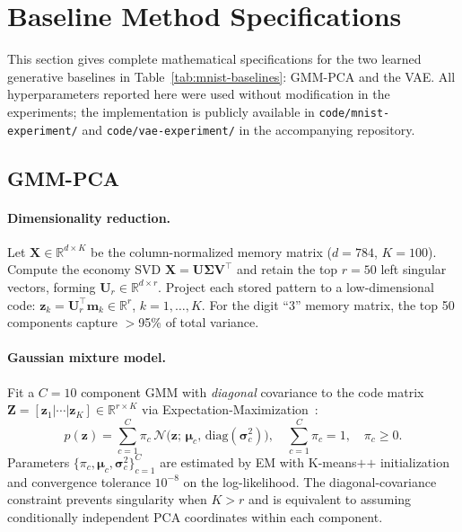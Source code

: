 \section{Baseline Method Specifications}\label{app:baseline-methods}

This section gives complete mathematical specifications for the two learned generative
baselines in Table~\ref{tab:mnist-baselines}: GMM-PCA and the VAE.
All hyperparameters reported here were used without modification in the experiments;
the implementation is publicly available in \texttt{code/mnist-experiment/} and
\texttt{code/vae-experiment/} in the accompanying repository.

\subsection{GMM-PCA}\label{app:gmm-pca}

\paragraph{Dimensionality reduction.}
Let $\mathbf{X}\in\mathbb{R}^{d\times K}$ be the column-normalized memory matrix
($d{=}784$, $K{=}100$). Compute the economy SVD
$\mathbf{X}=\mathbf{U}\boldsymbol{\Sigma}\mathbf{V}^{\!\top}$ and retain the top
$r{=}50$ left singular vectors, forming $\mathbf{U}_{r}\in\mathbb{R}^{d\times r}$.
Project each stored pattern to a low-dimensional code:
$\mathbf{z}_{k}=\mathbf{U}_{r}^{\!\top}\mathbf{m}_{k}\in\mathbb{R}^{r}$, $k=1,\dots,K$.
For the digit ``3'' memory matrix, the top 50 components capture $>$95\% of total variance.

\paragraph{Gaussian mixture model.}
Fit a $C{=}10$ component GMM with \emph{diagonal} covariance to the code matrix
$\mathbf{Z}{=}[\mathbf{z}_1|\cdots|\mathbf{z}_K]\in\mathbb{R}^{r\times K}$ via
Expectation-Maximization~\cite{dempsterMaximumLikelihoodIncomplete1977}:
\begin{equation}
  p(\mathbf{z}) = \sum_{c=1}^{C}\pi_c\,
  \mathcal{N}\!\bigl(\mathbf{z};\,\boldsymbol{\mu}_c,\,\mathrm{diag}(\boldsymbol{\sigma}_c^2)\bigr),
  \quad \sum_{c=1}^{C}\pi_c=1,\quad \pi_c\geq 0.
\end{equation}
Parameters $\{\pi_c,\boldsymbol{\mu}_c,\boldsymbol{\sigma}_c^2\}_{c=1}^{C}$ are estimated
by EM with K-means$\texttt{++}$ initialization and convergence tolerance $10^{-8}$ on the
log-likelihood.
The diagonal-covariance constraint prevents singularity when $K>r$ and is equivalent to
assuming conditionally independent PCA coordinates within each component.

